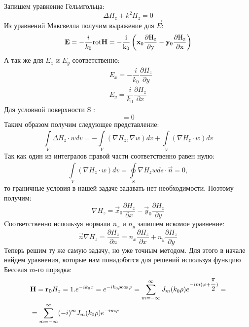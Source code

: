 Запишем уравнение Гельмгольца:
\begin{equation}
\Delta H_{z} + k^2H_{z} = 0
\end{equation}
Из уравнений Максвелла получим выражение для $\vec{E}$:
\begin{equation}
	\vec{E} = - \dfrac{i}{k_{0}} \rm rot\vec{H} = - \dfrac{i}{k_{0}} \left({\vec x}_{0}\dfrac{\partial {H_{z}}}{\partial y} - {\vec y}_{0}\dfrac{\partial {H_{z}}}{\partial x}\right)
\end{equation}
А так же для $ E_{x}$ и $E_{y} $ соответственно:
\begin{align}
	&E_{x} = - 
	\dfrac{i}{k_{0}}
	\dfrac{\partial{H_{z}}}{\partial y} \\
	&E_{y} = \dfrac{i}{k_{0}}
	\dfrac{\partial{H_{z}}}{\partial x}
\end{align}
Для условной поверхности S : \\
\begin{equation}
[\vec{n}, \vec{x_{0}}E_{x} + \vec{y_{0}}E_{y}] = 0
\end{equation}
Таким образом получим следующее представление:
\begin{equation}
	\int\limits_{V}^{} \Delta H_{z} \cdot wdv = - \int\limits_{V}^{}(\nabla H_{z}, \nabla w)dv +  \int\limits_{V}^{}(\nabla H_{z} \cdot w)dv
\end{equation}
Так как один из интегралов правой части соответственно равен нулю: 
\begin{equation}
	\int\limits_{V}^{}(\nabla H_{z} \cdot w)dv = \oint\limits_{S}^{} \nabla H_{z}  wds \cdot \vec{n} = 0,
\end{equation}
то граничные условия в нашей задаче задавать нет необходимости.
Поэтому получим:
\begin{equation}
	\nabla H_{z} = \vec{x}_{0} \dfrac{\partial H_{z}}{\partial x} - \vec{y}_{0}
	\dfrac{\partial H_{z}}{\partial y}
\end{equation}
Cоответственно используя нормали $n_{x}$ и $n_{y}$  запишем искомое уравнение:
\begin{equation}
	\vec{n}\nabla H_{z} = \dfrac{\partial H_{z}}{\partial n} = 
	n_{x}\dfrac{\partial H_{z}}{\partial x} +
	n_{y}\dfrac{\partial H_{z}}{\partial y}
\end{equation}
Теперь решим ту же самую задачу, но уже точным методом. Для этого в начале найдем уравнения, которые нам понадобятся для решений используя функцию Бесселя $m$-го порядка:
\begin{align}
	&\vec{H} = \vec{r_{0}}H_{z}
	 = 1.e^{-ik_{0}x} = e^{-ik_{0}\rho \rm cos\varphi} = 
	\sum\limits_{m=-\infty}^{\infty} J_{m}(k_{0}\rho)e^{-im(\varphi + \dfrac{\pi}{2})} =\notag\\
	&= \sum\limits_{m=-\infty}^{\infty} (-i)^{m}J_{m}(k_{0}\rho)e^{-im\varphi}
\end{align}
